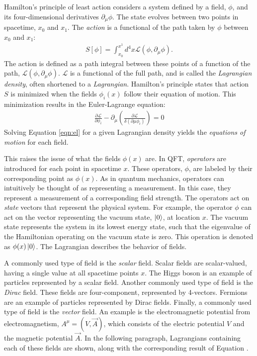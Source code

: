 Hamilton's principle of least action considers a system defined by a field, $\phi$, and its four-dimensional derivatives $\partial_\mu\phi$.
The state evolves between two points in spacetime, $x_0$ and $x_1$.
The \emph{action} is a functional of the path taken by $\phi$ between $x_0$ and $x_1$:
\begin{equation}\begin{split}
S[\phi]=\int_{x_0}^{x^1} d^4x\mathcal{L}(\phi,\partial_\mu\phi).
\end{split}\end{equation}
The action is defined as a path integral between these points of a function of the path, $\mathcal{L}(\phi,\partial_\mu\phi)$.
$\mathcal{L}$ is a functional of the full path, and is called the \emph{Lagrangian density}, often shortened to a \emph{Lagrangian}.
Hamilton's principle states that action $S$ is minimized when the fields $\phi_i(x)$ follow their equation of motion.
This minimization results in the Euler-Lagrange equation:
\begin{equation}\begin{split}\label{eqn:el}
    \frac{\partial\mathcal{L}}{\partial\phi_i}-\partial_\mu\left(\frac{\partial\mathcal{L}}{\delta(\partial\mu\phi_i)}\right)=0
\end{split}\end{equation}
Solving Equation \ref{eqn:el} for a given Lagrangian density yields the \emph{equations of motion} for each field.

This raises the issue of what the fields $\phi(x)$ are.
In QFT, \emph{operators} are introduced for each point in spacetime $x$.
These operators, $\phi$, are labeled by their corresponding point as $\phi(x)$.
As in quantum mechanics, operators can intuitively be thought of as representing a measurement. In this case, they represent a measurement of a corresponding field strength.
The operators act on \emph{state} vectors that represent the physical system.
For example, the operator $\phi$ can act on the vector representing the vacuum state, $\ket{0}$, at location $x$.
The vacuum state represents the system in its lowest energy state, such that the eigenvalue of the Hamiltonian operating on the vacuum state is zero.
This operation is denoted as $\phi(x)\ket{0}$.
The Lagrangian describes the behavior of fields.

A commonly used type of field is the \emph{scalar} field.
Scalar fields are scalar-valued, having a single value at all spacetime points $x$.
The Higgs boson is an example of particles represented by a scalar field.
Another commonly used type of field is the \emph{Dirac} field.
These fields are four-component, represented by 4-vectors.
Fermions are an example of particles represented by Dirac fields.
Finally, a commonly used type of field is the \emph{vector} field.
An example is the electromagnetic potential from electromagnetism, $A^\mu=(V,\vec{A})$, which consists of the electric potential $V$ and the magnetic potential $\vec{A}$.
In the following paragraph, Lagrangians containing each of these fields are shown, along with the corresponding result of Equation \label{eqn:el}.


